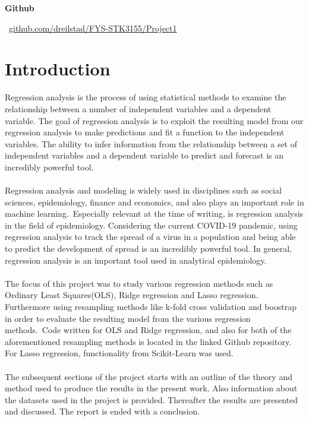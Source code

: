 \documentclass[a4paper,twocolumn]{article}
\begin{document}
\raggedbottom
\begin{center}
    \small \textbf{Github}
    
    \vspace{0.2cm}
    
    \faGithub \ \small \href{https://github.com/dreilstad/FYS-STK3155/tree/master/Project1}{github.com/dreilstad/FYS-STK3155/Project1}
\end{center}
\vspace{0.5cm}
\section{Introduction}
Regression analysis is the process of using statistical methods to examine the relationship between a number of independent variables and a dependent variable. The goal of regression analysis is to exploit the resulting model from our regression analysis to make predictions and fit a function to the independent variables. The ability to infer information from the relationship between a set of independent variables and a dependent variable to predict and forecast is an incredibly powerful tool.\\
\\
Regression analysis and modeling is widely used in disciplines such as social sciences, epidemiology, finance and economics, and also plays an important role in machine learning.\ Especially relevant at the time of writing, is regression analysis in the field of epidemiology. Considering the current COVID-19 pandemic, using regression analysis to track the spread of a virus in a population and being able to predict the development of spread is an incredibly powerful tool. In general, regression analysis is an important tool used in analytical epidemiology.\cite{epidemiology}\\
\\
The focus of this project was to study various regression methods such as Ordinary Least Squares(OLS), Ridge regression and Lasso regression. Furthermore using resampling methods like k-fold cross validation and boostrap in order to evaluate the resulting model from the various regression methods.\ Code written for OLS and Ridge regression, and also for both of the aforementioned resampling methods is located in the linked Github repository. For Lasso regression, functionality from Scikit-Learn was used. \\
\\
The subsequent sections of the project starts with an outline of the theory and method used to produce the results in the present work. Also information about the datasets used in the project is provided. Thereafter the results are presented and discussed. The report is ended with a conclusion.
\end{document}
